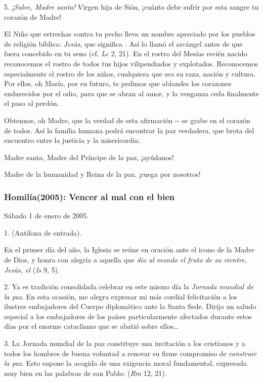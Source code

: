 5. \emph{¡Salve, Madre santa!} Virgen hija de Sión, ¡cuánto debe sufrir por esta sangre tu corazón de Madre!

El Niño que estrechas contra tu pecho lleva un nombre apreciado por los pueblos de religión bíblica: \emph{Jesús}, que significa . Así lo llamó el arcángel antes de que fuera concebido en tu seno (cf. \emph{Lc} 2, 21). En el rostro del Mesías recién nacido reconocemos el rostro de todos tus hijos vilipendiados y explotados. Reconocemos especialmente el rostro de los niños, cualquiera que sea su raza, nación y cultura. Por ellos, oh María, por su futuro, te pedimos que ablandes los corazones endurecidos por el odio, para que se abran al amor, y la venganza ceda finalmente el paso al perdón.

Obtennos, oh Madre, que la verdad de esta afirmación -- se grabe en el corazón de todos. Así la familia humana podrá encontrar la paz verdadera, que brota del encuentro entre la justicia y la misericordia.

Madre santa, Madre del Príncipe de la paz, ¡ayúdanos!

Madre de la humanidad y Reina de la paz, ¡ruega por nosotros!

\subsubsection{Homilía(2005): Vencer al mal con el bien}

Sábado 1 de enero de 2005.

1.  (Antífona de entrada).

En el primer día del año, la Iglesia se reúne en oración ante el icono de la Madre de Dios, y honra con alegría a aquella que \emph{dio al mundo el fruto de su vientre, Jesús, el } (\emph{Is} 9, 5).

2. Ya es tradición consolidada celebrar en este mismo día la \emph{Jornada mundial de la paz}. En esta ocasión, me alegra expresar mi más cordial felicitación a los ilustres embajadores del Cuerpo diplomático ante la Santa Sede. Dirijo un saludo especial a los embajadores de los países particularmente afectados durante estos días por el enorme cataclismo que se abatió sobre ellos\ldots{}

3. La Jornada mundial de la paz constituye una invitación a los cristianos y a todos los hombres de buena voluntad a renovar su firme compromiso de \emph{construir la paz}. Esto supone la acogida de una exigencia moral fundamental, expresada muy bien en las palabras de san Pablo:  (\emph{Rm} 12, 21).

